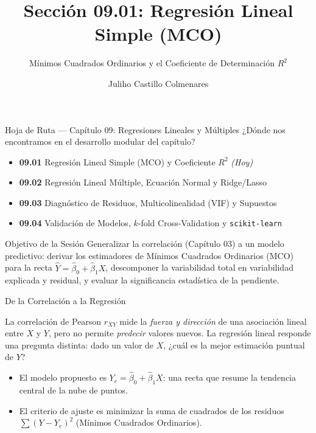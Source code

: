 \documentclass[10pt, aspectratio=169]{beamer}
\title[Regresión Lineal Simple]{Sección 09.01: Regresión Lineal Simple (MCO)}
\subtitle{Mínimos Cuadrados Ordinarios y el Coeficiente de Determinación $R^2$}
\author[J. Castillo Colmenares]{Juliho Castillo Colmenares}
\institute{Tecnológico de Monterrey}
\date{\vspace{-1.2cm}}
\begin{document}
\begin{frame}[plain]
  \titlepage
\end{frame}

\begin{frame}{Hoja de Ruta --- Capítulo 09: Regresiones Lineales y Múltiples}
  \footnotesize
  ¿Dónde nos encontramos en el desarrollo modular del capítulo? \pause
  \begin{itemize}\itemsep=0.08em
    \item \textbf{09.01} Regresión Lineal Simple (MCO) y Coeficiente $R^2$ \emph{(Hoy)} \pause
    \item \textbf{09.02} Regresión Lineal Múltiple, Ecuación Normal y Ridge/Lasso \pause
    \item \textbf{09.03} Diagnóstico de Residuos, Multicolinealidad (VIF) y Supuestos \pause
    \item \textbf{09.04} Validación de Modelos, $k$-fold Cross-Validation y \texttt{scikit-learn}
  \end{itemize}
  \vspace{-0.05cm}
  \begin{block}{Objetivo de la Sesión}
    Generalizar la correlación (Capítulo 03) a un modelo predictivo: derivar los estimadores de Mínimos Cuadrados Ordinarios (MCO) para la recta $\hat Y=\hat\beta_0+\hat\beta_1 X$, descomponer la variabilidad total en variabilidad explicada y residual, y evaluar la significancia estadística de la pendiente.
  \end{block}
\end{frame}

\begin{frame}{De la Correlación a la Regresión}
  \footnotesize
  \begin{motivacion}
    La correlación de Pearson $r_{XY}$ mide la \emph{fuerza y dirección} de una asociación lineal entre $X$ y $Y$, pero no permite \emph{predecir} valores nuevos. La regresión lineal responde una pregunta distinta: dado un valor de $X$, ¿cuál es la mejor estimación puntual de $Y$?
  \end{motivacion}

  \vspace{0.15cm}
  \pause
  \begin{itemize}\itemsep=0.1cm
    \item El modelo propuesto es $Y_e=\hat\beta_0+\hat\beta_1 X$: una recta que resume la tendencia central de la nube de puntos. \pause
    \item El criterio de ajuste es minimizar la suma de cuadrados de los residuos $\sum(Y-Y_e)^2$ (Mínimos Cuadrados Ordinarios).
  \end{itemize}
\end{frame}
\end{document}

